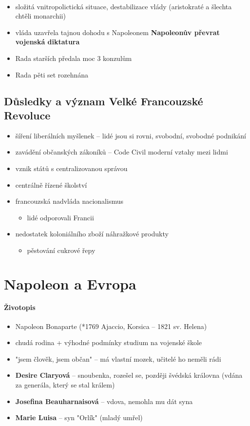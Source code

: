 \paragraph{}
\begin{itemize}
\item složitá vnitropolictická situace, destabilizace vlády (aristokraté a šlechta chtěli monarchii)
\item vláda uzavřela tajnou dohodu s Napoleonem \ra \textbf{Napoleonův převrat} \ra \textbf{vojenská diktatura}
\item Rada starších předala moc 3 konzulům
\item Rada pěti set rozehnána
\end{itemize}

\subsection{Důsledky a význam Velké Francouzské Revoluce}
\begin{itemize}
\item šíření liberálních myšlenek -- lidé jsou si rovni, svobodní, svobodné podnikání
\item zavádění občanských zákoníků -- Code Civil \ra moderní vztahy mezi lidmi
\item vznik států s centralizovanou správou
\item centrálně řízené školství
\item francouzská nadvláda \ra nacionalismus
	\begin{itemize}
	\item lidé odporovali Francii
	\end{itemize}
\item nedostatek koloniálního zboží \ra náhražkové produkty
	\begin{itemize}
    \item pěstování cukrové řepy
	\end{itemize}
\end{itemize}


\section{Napoleon a Evropa}
\paragraph{Životopis}
\begin{itemize}
\item Napoleon Bonaparte (*1769 Ajaccio, Korsica -- 1821 sv. Helena)
\item chudá rodina + výhodné podmínky \ra studium na vojenské škole
\item "jsem člověk, jsem občan" -- má vlastní mozek, učitelé ho neměli rádi
\item \textbf{Desire Claryová} -- snoubenka, rozešel se, později švédská královna (vdána za generála, který se stal králem)
\item \textbf{Josefina Beauharnaisová} -- vdova, nemohla mu dát syna
\item \textbf{Marie Luisa} -- syn "Orlík" (mladý umřel)
\end{itemize}

